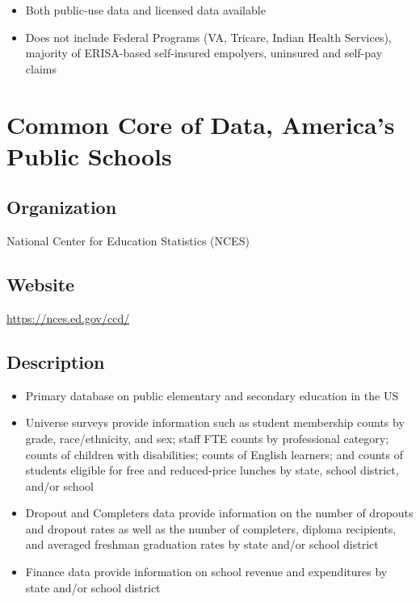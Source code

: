 \documentclass[
]{book}
\providecommand{\tightlist}{%
  \setlength{\itemsep}{0pt}\setlength{\parskip}{0pt}}
\begin{document}
\begin{itemize}
\tightlist
\item
  Both public-use data and licensed data available
\item
  Does not include Federal Programs (VA, Tricare, Indian Health Services), majority of ERISA-based self-insured empolyers, uninsured and self-pay claims
\end{itemize}

\mainmatter

\hypertarget{common-core-of-data-americas-public-schools}{%
\chapter{Common Core of Data, America's Public Schools}\label{common-core-of-data-americas-public-schools}}

\hypertarget{organization-17}{%
\section{Organization}\label{organization-17}}

National Center for Education Statistics (NCES)

\hypertarget{website-17}{%
\section{Website}\label{website-17}}

\url{https://nces.ed.gov/ccd/}

\hypertarget{description-17}{%
\section{Description}\label{description-17}}

\begin{itemize}
\tightlist
\item
  Primary database on public elementary and secondary education in the US
\item
  Universe surveys provide information such as student membership counts by grade, race/ethnicity, and sex; staff FTE counts by professional category; counts of children with disabilities; counts of English learners; and counts of students eligible for free and reduced-price lunches by state, school district, and/or school
\item
  Dropout and Completers data provide information on the number of dropouts and dropout rates as well as the number of completers, diploma recipients, and averaged freshman graduation rates by state and/or school district
\item
  Finance data provide information on school revenue and expenditures by state and/or school district
\end{itemize}
\end{document}
